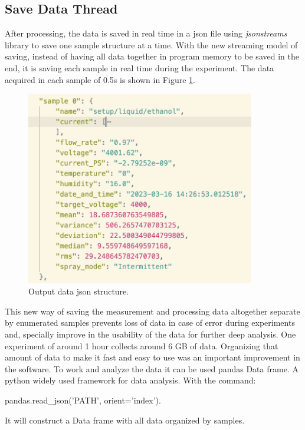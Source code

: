     \subsection{Save Data Thread}
    \label{subsec:save_thread}

        After processing, the data is saved in real time in a json file using \emph{jsonstreams} library to save one sample structure at a time.
        With the new streaming model of saving, instead of having all data together in program memory to be saved in the end, it is saving each sample in real time during the experiment.
        The data acquired in each sample of 0.5s is shown in Figure \ref{fig:data_sample}.
    
        \begin{figure}[H]
            \center
            \includegraphics[width=10cm]{Figuras/19:03/new_sample.png}
            \caption{Output data json structure.}
            \label{fig:data_sample}
        \end{figure}
    
        This new way of saving the measurement and processing data altogether separate by enumerated samples prevents loss of data in case of error during experiments and, specially improve in the usability of the data for further deep analysis. One experiment of around 1 hour collects around 6 GB of data. Organizing that amount of data to make it fast and easy to use was an important improvement in the software.
        To work and analyze the data it can be used pandas Data frame. A python widely used framework for data analysis.
        With the command:
        
        pandas.read\_json('PATH', orient='index').

        It will construct a Data frame with all data organized by samples.
    
